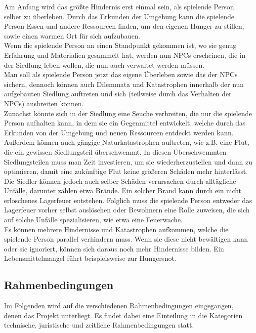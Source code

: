 \documentclass[paper=A4,pagesize=auto,12pt,headinclude=true,footinclude=true,BCOR=0mm,DIV=calc]{scrartcl}
\newcommand{\sectionspace}{
	\vspace{0.5cm}
}
\begin{document}
Am Anfang wird das größte Hindernis erst einmal sein, als spielende Person selber zu überleben.
Durch das Erkunden der Umgebung kann die spielende Person Essen und andere Ressourcen finden, um den eigenen Hunger zu stillen, sowie einen warmen Ort für sich aufzubauen.\\
Wenn die spielende Person an einen Standpunkt gekommen ist, wo sie genug Erfahrung und Materialien gesammelt hat, werden nun NPCs erscheinen, die in der Siedlung leben wollen, die nun auch verwaltet werden müssen.\\
Man soll als spielende Person jetzt das eigene Überleben sowie das der NPCs sichern, dennoch können auch Dilemmata und Katastrophen innerhalb der nun aufgebauten Siedlung auftreten und sich (teilweise durch das Verhalten der NPCs) ausbreiten können.\\
Zunächst könnte sich in der Siedlung eine Seuche verbreiten, die nur die spielende Person aufhalten kann, in dem sie ein Gegenmittel entwickelt, welche durch das Erkunden von der Umgebung und neuen Ressourcen entdeckt werden kann.\\
Außerdem können auch gängige Naturkatastrophen auftreten, wie z.B. eine Flut, die ein gewissen Siedlungsteil überschwemmt. In diesen Überschwemmten Siedlungsteilen muss man Zeit investieren, um sie wiederherzustellen und dann zu optimieren, damit eine zukünftige Flut keine größeren Schäden mehr hinterlässt.\\
Die Siedler können jedoch auch selber Schäden verursachen durch alltägliche Unfälle, darunter zählen etwa Brände. Ein solcher Brand kann durch ein nicht erloschenes Lagerfeuer entstehen. Folglich muss die spielende Person entweder das Lagerfeuer vorher selbst auslöschen oder Bewohnern eine Rolle zuweisen, die sich auf solche Unfälle spezialisieren, wie etwa eine Feuerwache. \\
Es können mehrere Hindernisse und Katastrophen aufkommen, welche die spielende Person parallel verhindern muss. Wenn sie diese nicht bewältigen kann oder sie ignoriert, können sich daraus noch mehr Hindernisse bilden. Ein Lebensmittelmangel führt beispielsweise zur Hungersnot.

\sectionspace
\subsection{Rahmenbedingungen}\label{sec:Rahmenbedingungen}
Im Folgenden wird auf die verschiedenen Rahmenbedingungen eingegangen, denen das Projekt unterliegt. Es findet dabei eine Einteilung in die Kategorien technische, juristische und zeitliche Rahmenbedingungen statt. %
\end{document}
